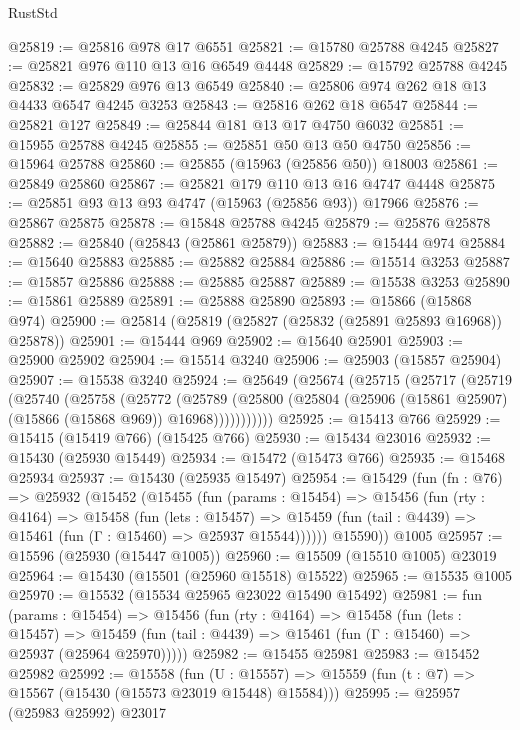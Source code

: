 \begin{lexlean}{RustStd}
\begin{coremodule}
{\begin{coremodule}
{{{{{{{{{{{{{{{{{{{{{{{{{{{{{{{{{{{{{{{{{{{{{{{{{{{{{{{{{{{{@25819 := @25816 @978 @17 @6551
@25821 := @15780 @25788 @4245
@25827 := @25821 @976 @110 @13 @16 @6549 @4448
@25829 := @15792 @25788 @4245
@25832 := @25829 @976 @13 @6549
@25840 := @25806 @974 @262 @18 @13 @4433 @6547 @4245 @3253
@25843 := @25816 @262 @18 @6547
@25844 := @25821 @127
@25849 := @25844 @181 @13 @17 @4750 @6032
@25851 := @15955 @25788 @4245
@25855 := @25851 @50 @13 @50 @4750
@25856 := @15964 @25788
@25860 := @25855 (@15963 (@25856 @50)) @18003
@25861 := @25849 @25860
@25867 := @25821 @179 @110 @13 @16 @4747 @4448
@25875 := @25851 @93 @13 @93 @4747 (@15963 (@25856 @93)) @17966
@25876 := @25867 @25875
@25878 := @15848 @25788 @4245
@25879 := @25876 @25878
@25882 := @25840 (@25843 (@25861 @25879))
@25883 := @15444 @974
@25884 := @15640 @25883
@25885 := @25882 @25884
@25886 := @15514 @3253
@25887 := @15857 @25886
@25888 := @25885 @25887
@25889 := @15538 @3253
@25890 := @15861 @25889
@25891 := @25888 @25890
@25893 := @15866 (@15868 @974)
@25900 := @25814 (@25819 (@25827 (@25832 (@25891 @25893 @16968)) @25878))
@25901 := @15444 @969
@25902 := @15640 @25901
@25903 := @25900 @25902
@25904 := @15514 @3240
@25906 := @25903 (@15857 @25904)
@25907 := @15538 @3240
@25924 := @25649
    (@25674
      (@25715
        (@25717
          (@25719
            (@25740
              (@25758
                (@25772
                  (@25789
                    (@25800 (@25804 (@25906 (@15861 @25907) (@15866 (@15868 @969)) @16968)))))))))))
@25925 := @15413 @766
@25929 := @15415 (@15419 @766) (@15425 @766)
@25930 := @15434 @23016
@25932 := @15430 (@25930 @15449)
@25934 := @15472 (@15473 @766)
@25935 := @15468 @25934
@25937 := @15430 (@25935 @15497)
@25954 := @15429
    (fun (fn : @76) =>
    @25932
      (@15452
        (@15455
          (fun (params : @15454) =>
          @15456
            (fun (rty : @4164) =>
            @15458
              (fun (lets : @15457) =>
              @15459 (fun (tail : @4439) => @15461 (fun (Γ : @15460) => @25937 @15544))))))
        @15590))
    @1005
@25957 := @15596 (@25930 (@15447 @1005))
@25960 := @15509 (@15510 @1005) @23019
@25964 := @15430 (@15501 (@25960 @15518) @15522)
@25965 := @15535 @1005
@25970 := @15532 (@15534 @25965 @23022 @15490 @15492)
@25981 := fun (params : @15454) =>
  @15456
    (fun (rty : @4164) =>
    @15458
      (fun (lets : @15457) =>
      @15459 (fun (tail : @4439) => @15461 (fun (Γ : @15460) => @25937 (@25964 @25970)))))
@25982 := @15455 @25981
@25983 := @15452 @25982
@25992 := @15558
    (fun (U : @15557) => @15559 (fun (t : @7) => @15567 (@15430 (@15573 @23019 @15448) @15584)))
@25995 := @25957 (@25983 @25992) @23017
}}}}}}}}}}}}}}}}}}}}}}}}}}}}}}}}}}}}}}}}}}}}}}}}}}}}}}}}}}}}
\end{coremodule}}
\end{coremodule}
\end{lexlean}
